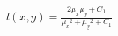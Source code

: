 \documentclass[preview]{standalone}
\begin{document}
\begin{align*}
l(x,y) = \frac{2\mu_x\mu_y + C_1}{{\mu_x}^2 + {\mu_y}^2 + C_1}
\end{align*}
\end{document}
